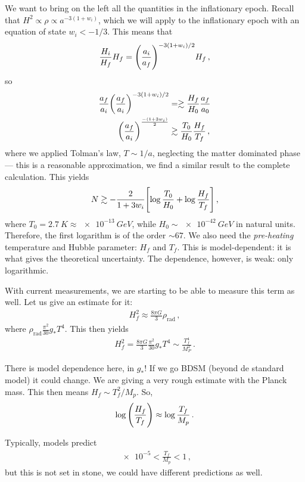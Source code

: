 \documentclass[main.tex]{subfiles}
\begin{document}
We want to bring on the left all the quantities in the inflationary epoch. 
Recall that \(H^2 \propto \rho \propto a^{-3 (1+ w_i)}\), which we will apply to the inflationary epoch with an equation of state \(w_i < - 1/3\). This means that 
%
\begin{align}
\frac{H_i}{H_f} H_f = \qty(\frac{a_i}{a_f})^{-3(1+ w_i) / 2} H_f
\,,
\end{align}
%
so 
%
\begin{align}
\frac{a_f}{a_i} \qty(\frac{a_f}{a_i})^{- 3 (1+ w_i) / 2} &=\gtrsim  
\frac{H_f}{H_0} \frac{a_f}{a_0 } \\
\qty(\frac{a_f}{a_i})^{\frac{-(1 + 3 w_i)}{2}}
&\gtrsim \frac{T_0 }{H_0 } \frac{H_f}{T_f}
\,,
\end{align}
%
where we applied Tolman's law, \(T \sim 1/a\), neglecting the matter dominated phase --- this is a reasonable approximation, we find a similar result to the complete calculation. This yields 
%
\begin{align}
N \gtrsim - \frac{2}{1 + 3 w _i} \qty[ \log \frac{T_0 }{H_0 } + \log \frac{H_f}{T_f}]
\,,
\end{align}
%
where \(T_0 = \SI{2.7}{K} \approx \SI{e-13}{GeV}\), while \(H_0 \sim \SI{e-42}{GeV}\) in natural units. Therefore, the first logarithm is of the order \(\sim 67\). 
We also need the \emph{pre-heating} temperature and Hubble parameter: \(H_f\) and \(T_f\). 
This is model-dependent: it is what gives the theoretical uncertainty. 
The dependence, however, is weak: only logarithmic. 

With current measurements, we are starting to be able to measure this term as well. 
Let us give an estimate for it: 
%
\begin{align}
H_f^2 \approx \frac{8 \pi G}{3} \rho _{\text{rad}}
\,,
\end{align}
%
where \(\rho _{\text{rad}} \frac{\pi^2}{30} g_* T^{4}\). This then yields 
%
\begin{align}
H^2_f = \frac{8 \pi G}{3} \frac{\pi^2}{30} g_* T^{4} \sim \frac{T_f^4}{M_P^2}
\,.
\end{align}

There is model dependence here, in \(g_*\)! If we go BDSM (beyond de standard model) it could change. 
We are giving a very rough estimate with the Planck mass. This then means \(H_f \sim T_f^2 / M_p\). So, 
%
\begin{align}
\log \qty( \frac{H_f}{T_f}) \approx \log \frac{T_f}{M_p}
\,.
\end{align}

Typically, models predict 
%
\begin{align}
\num{e-5} < \frac{T_f}{M_p} < 1
\,,
\end{align}
%
but this is not set in stone, we could have different predictions as well. 
\end{document}
